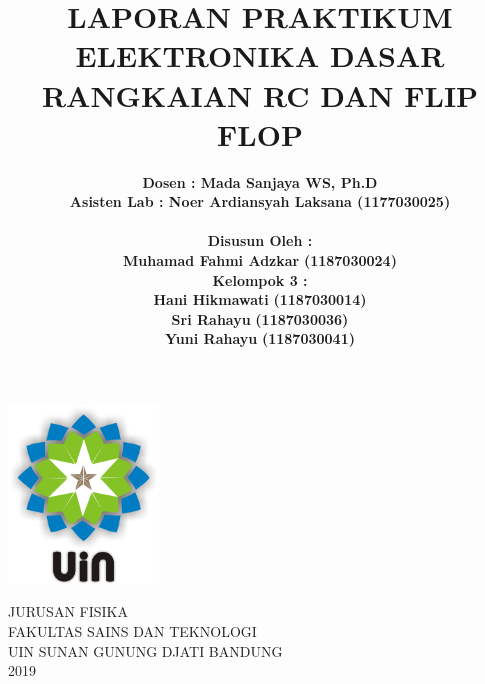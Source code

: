 \documentclass[12pt,a4paper]{article}
\begin{document}
\onehalfspacing
\begin{titlepage}

\title{\textbf{LAPORAN PRAKTIKUM ELEKTRONIKA DASAR
\\ RANGKAIAN RC DAN FLIP FLOP }}  %
\author{\textbf {Dosen : Mada Sanjaya WS, Ph.D }
\\ \textbf{Asisten Lab : Noer Ardiansyah Laksana (1177030025)}
\\ \textbf{ }
\\ \textbf{Disusun Oleh :}
\\ \textbf{Muhamad Fahmi Adzkar} \textbf {(1187030024)}
\\ \textbf{Kelompok 3 :}
\\ \textbf{Hani Hikmawati} \textbf {(1187030014)}
\\ \textbf{Sri Rahayu} \textbf {(1187030036)}
\\ \textbf{Yuni Rahayu} \textbf {(1187030041)}}

\maketitle
\begin{center}
\vspace{1cm}
\includegraphics[width=4cm]{uin.png}
\vspace{1cm}

JURUSAN FISIKA\\
FAKULTAS SAINS DAN TEKNOLOGI\\
UIN SUNAN GUNUNG DJATI BANDUNG\\
2019\\
\end{center}
\end{titlepage}
\end{document}
